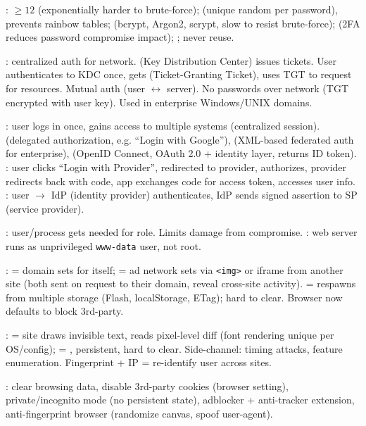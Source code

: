 :  $\ge 12$ (exponentially harder to brute-force);  (unique random per password), prevents rainbow tables;  (bcrypt, Argon2, scrypt, slow to resist brute-force);  (2FA reduces password compromise impact); ; never reuse.

: centralized auth for network.  (Key Distribution Center) issues tickets. User authenticates to KDC once, gets  (Ticket-Granting Ticket), uses TGT to request  for resources. Mutual auth (user $\leftrightarrow$ server). No passwords over network (TGT encrypted with user key). Used in enterprise Windows/UNIX domains.

: user logs in once, gains access to multiple systems (centralized session).  (delegated authorization, e.g. ``Login with Google''),  (XML-based federated auth for enterprise),  (OpenID Connect, OAuth 2.0 + identity layer, returns ID token). : user clicks ``Login with Provider'', redirected to provider, authorizes, provider redirects back with code, app exchanges code for access token, accesses user info. : user $\to$ IdP (identity provider) authenticates, IdP sends signed assertion to SP (service provider).

: user/process gets  needed for role. Limits damage from compromise. : web server runs as unprivileged \texttt{www-data} user, not root.


:  = domain sets for itself;  = ad network sets via \texttt{<img>} or iframe from another site (both sent on request to their domain, reveal cross-site activity).  = respawns from multiple storage (Flash, localStorage, ETag); hard to clear. Browser now defaults to block 3rd-party.

:  = site draws invisible text, reads pixel-level diff (font rendering unique per OS/config);  = , persistent, hard to clear. Side-channel: timing attacks, feature enumeration. Fingerprint + IP = re-identify user across sites.

: clear browsing data, disable 3rd-party cookies (browser setting), private/incognito mode (no persistent state), adblocker + anti-tracker extension, anti-fingerprint browser (randomize canvas, spoof user-agent). 

